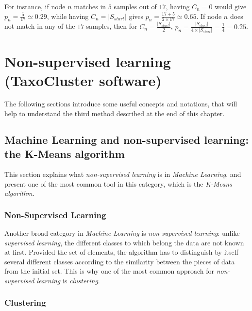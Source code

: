 \documentclass{report}
\begin{document}
For instance, if node $n$ matches in $5$ samples out of $17$, having $C_{n} = 0$ would give $p_{n} = \frac{5}{17} \simeq 0.29$, while having $C_{n} = |S_{start}|$ gives $p_{n} = \frac{17 + 5}{2 \times 17} \simeq 0.65 $. If node $n$ does not match in any of the $17$ samples, then for $C_{n} = \frac{|S_{start}|}{2}$, $p_{n} = \frac{|S_{start}|}{4 \times |S_{start}|} = \frac{1}{4} = 0.25$.\\


\chapter{Non-supervised learning (TaxoCluster software)}

The following sections introduce some useful concepts and notations, that will help to understand the third method described at the end of this chapter.

\section{Machine Learning and non-supervised learning: the K-Means algorithm}

This section explains what \emph{non-supervised learning} is in \emph{Machine Learning}, and present one of the most common tool in this category, which is the \emph{K-Means algorithm}.

\subsection{Non-Supervised Learning}

Another broad category in \emph{Machine Learning} is \emph{non-supervised learning}: unlike \emph{supervised learning}, the different classes to which belong the data are not known at first. Provided the set of elements, the algorithm has to distinguish by itself several different classes according to the similarity between the pieces of data from the initial set. This is why one of the most common approach for \emph{non-supervised learning} is \emph{clustering}.

\subsection{Clustering}
\end{document}
